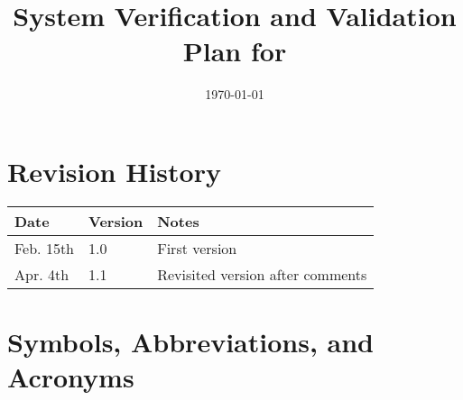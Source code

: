 \documentclass[12pt, titlepage]{article}
\begin{document}
\title{System Verification and Validation Plan for \progname{}} 
\author{\authname}
\date{\today}
	
\maketitle


\section*{Revision History}

\begin{tabularx}{\textwidth}{p{3cm}p{2cm}X}
\toprule {\bf Date} & {\bf Version} & {\bf Notes}\\
\midrule
Feb. 15th & 1.0 & First version\\
Apr. 4th & 1.1 & Revisited version after comments\\
\bottomrule
\end{tabularx}



\newpage

\tableofcontents



\newpage

\section{Symbols, Abbreviations, and Acronyms}
\end{document}
